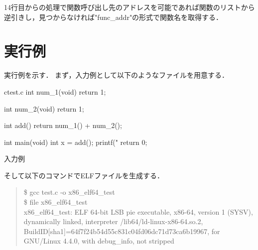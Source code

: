\documentclass[12pt,a4paper,dvipdfmx]{jsarticle}
\begin{document}
14行目からの処理で関数呼び出し先のアドレスを可能であれば関数のリストから
逆引きし，見つからなければ"func\_{addr}"の形式で関数名を取得する．

\section{実行例}
実行例を示す．
まず，入力例として以下のようなファイルを用意する．
\begin{longlisting}
\begin{myminted}{c}{test.c}
int num_1(void) {
    return 1;
}

int num_2(void) {
    return 1;
}

int add() {
    return num_1() + num_2();
}

int main(void) {
    int x = add();
    printf("%
    return 0;
}
\end{myminted}
\caption{入力例}
\label{lst:input}
\end{longlisting}

そして以下のコマンドでELFファイルを生成する．
\begin{quote}
\$ gcc test.c -o x86\_elf64\_test \\
\$ file x86\_elf64\_test \\
x86\_elf64\_test: ELF 64-bit LSB pie executable, x86-64, version 1 (SYSV), dynamically linked, interpreter /lib64/ld-linux-x86-64.so.2, BuildID[sha1]=64f7f24b54d55c831c04fd06dc71d73ca6b19967, for GNU/Linux 4.4.0, with debug\_info, not stripped
\end{quote}
\end{document}
